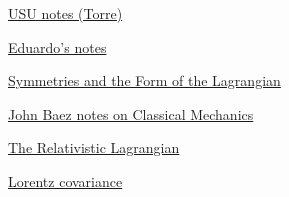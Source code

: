 \begin{thebibliography}

 \href{http://www.physics.usu.edu/torre/6010_Fall_2010/Lectures/04.pdf}{USU notes (Torre)}

 \href{http://eduardo.physics.illinois.edu/phys582/582-chapter3.pdf}{Eduardo's notes}

 \href{http://home.strw.leidenuniv.nl/~icke/ps/SymmetryLagrangian.pdf}{Symmetries and the Form of the Lagrangian}

 \href{http://math.ucr.edu/home/baez/classical/texfiles/2005/book/classical.pdf}{John Baez notes on Classical Mechanics}

 \href{http://fma.if.usp.br/~amsilva/Livros/Zwiebach/chapter5.pdf}{The Relativistic Lagrangian}

 \href{http://eagle.phys.utk.edu/guidry/astro490/lectures/lecture490_ch4.pdf}{Lorentz covariance}


\end{thebibliography}




